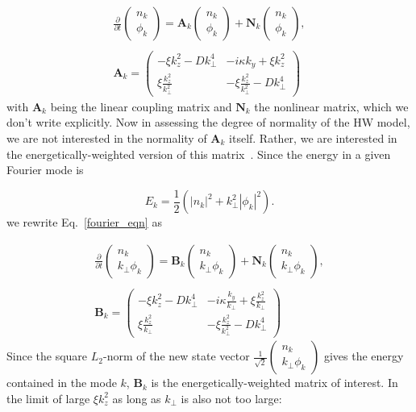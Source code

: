 \documentclass[letter,scriptaddress,twocolumn, prl,showkeys]{revtex4}
\def\beq{\begin{equation}}
\def\eeq{\end{equation}}
\def\beqar{\begin{eqnarray}}
\def\eeqar{\end{eqnarray}}
\begin{document}
\beqar
\label{fourier_eqn}
\frac{\partial}{\partial t} \left( \begin{array}{cc} n_k \\ \phi_k \end{array} \right) = \mathbf{A}_k \left( \begin{array}{cc} n_k \\ \phi_k \end{array} \right) + \mathbf{N}_k \left( \begin{array}{cc} n_k \\ \phi_k \end{array} \right), \\ \nonumber \\
\mathbf{A}_k = \left( \begin{array}{cc} -\xi k_z^2 - D k_\perp^4 & -i \kappa k_y + \xi k_z^2 \\  \xi \frac{k_z^2}{k_\perp^2} & - \xi \frac{k_z^2}{k_\perp^2} - D k_\perp^4\end{array} \right)
\eeqar
with $\mathbf{A}_k$ being the linear coupling matrix and $\mathbf{N}_k$ the nonlinear matrix, which we don't write explicitly. 
Now in assessing the degree of normality of the HW model, we are not interested in the normality of $\mathbf{A}_k$ itself. 
Rather, we are interested in the energetically-weighted version of this matrix~\cite{camargo1998,schmid2007,camporeale2010}. Since the energy in a given Fourier mode is

\beq
\label{en_def}
E_k =  \frac{1}{2} \left( |n_k|^2 + k_\perp^2 |\phi_k|^2 \right).
\eeq
we rewrite Eq.~\ref{fourier_eqn} as

\beqar
\label{fourier_en_eqn}
\frac{\partial}{\partial t} \left( \begin{array}{cc} n_k \\ k_\perp \phi_k \end{array} \right) = \mathbf{B}_k \left( \begin{array}{cc} n_k \\ k_\perp \phi_k \end{array} \right) + \mathbf{N}_k \left( \begin{array}{cc} n_k \\ k_\perp \phi_k \end{array} \right), \\ \nonumber \\
\mathbf{B}_k = \left( \begin{array}{cc} -\xi k_z^2 - D k_\perp^4 & -i \kappa \frac{k_y}{k_\perp} + \xi \frac{k_z^2}{k_\perp} \\  \xi \frac{k_z^2}{k_\perp} & - \xi \frac{k_z^2}{k_\perp^2} - D k_\perp^4\end{array} \right)
\eeqar
Since the square $L_2$-norm of the new state vector $\frac{1}{\sqrt{2}} \left( \begin{array}{cc} n_k \\ k_\perp \phi_k \end{array} \right)$ gives the energy contained in the mode $k$,
$\mathbf{B}_k$ is the energetically-weighted matrix of interest. In the limit of large $\xi k_z^2$ as long as $k_\perp$ is also not too large:
\end{document}
